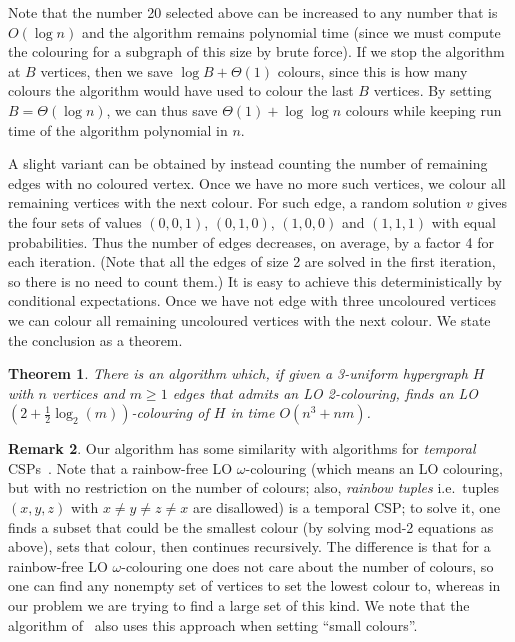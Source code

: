 \documentclass[a4paper,11pt]{article}
\theoremstyle{plain}
\newtheorem{theorem}{Theorem}
\theoremstyle{definition}
\newtheorem{remark}[theorem]{Remark}
\begin{document}
Note that the number 20 selected above can be increased to any number that is $O(\log n)$ and the algorithm remains polynomial time (since we must compute the colouring for a subgraph of this size by brute force). If we stop the algorithm at $B$ vertices, then we save $\log B + \Theta(1)$ colours, since this is how many colours the algorithm would have used to colour the last $B$ vertices. By setting $B = \Theta(\log n)$, we can thus save $\Theta(1) + \log \log n$ colours while keeping run time of the algorithm polynomial in $n$.

A slight variant can be obtained by instead counting the number of remaining edges with no coloured vertex. Once we have no more such vertices, we colour all remaining vertices with the next colour. For such edge, a random solution $v$ gives the four sets of
values $(0,0,1)$, $(0,1,0)$, $(1,0,0)$ and $(1,1,1)$ with equal probabilities. 
Thus the number of edges decreases, on average, by a factor 4 for each
iteration. (Note that all the edges of size 2 are solved in the first iteration, so there is no need to count them.)
It is easy to achieve this deterministically by conditional
expectations.  Once we have not edge with three uncoloured vertices we can colour all remaining uncoloured vertices with the next colour. We state the conclusion as a theorem.

\begin{theorem}\label{thm:main2}
    There is an algorithm which, if given a 3-uniform hypergraph $H$ with $n$ vertices
    and $m \geq 1$ edges that admits an LO 2-colouring, finds an LO
    $(2 + \frac 12 \log_2(m))$-colouring of $H$ in time $O(n^3 + nm)$.
\end{theorem}

\begin{remark}
  Our algorithm has some similarity with algorithms for
  \emph{temporal} CSPs~\cite{BK10:jacm}. Note that a rainbow-free LO $\omega$-colouring
  (which means an LO colouring, but with no restriction on the number of
  colours; also, \emph{rainbow tuples} i.e.~tuples $(x, y, z)$ with $x \neq y \neq z \neq x$ are disallowed) is a temporal CSP; to solve it, one finds a subset that could be the
  smallest colour (by solving mod-2 equations as above), sets that colour, then
  continues recursively. The difference is that for a rainbow-free LO $\omega$-colouring one
  does not care about the number of colours, so one can find any nonempty set of
  vertices to set the lowest colour to, whereas in our problem we are trying to
  find a large set of this kind. We note that the algorithm of~\cite{NZ23:toct} also uses this approach when setting ``small colours''.
\end{remark}
\end{document}
